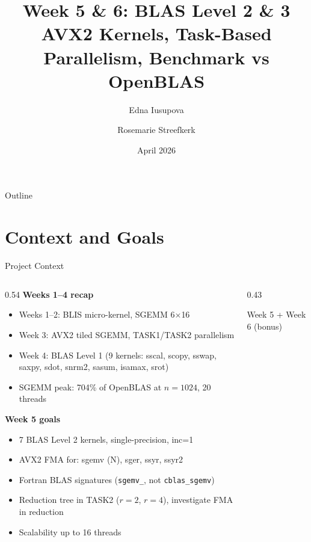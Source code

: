 \documentclass[aspectratio=169,10pt]{beamer}
\title[HPC TER - Week 5 \& 6]{Week 5 \& 6: BLAS Level 2 \& 3\\
       AVX2 Kernels, Task-Based Parallelism, Benchmark vs OpenBLAS}
\author{Edna Iusupova \and Rosemarie Streefkerk}
\institute{M1 QDCS --- Université Paris-Saclay\\TER High-Performance Computing}
\date{April 2026}
\begin{document}

\begin{frame}[plain]
  \titlepage
\end{frame}

\begin{frame}{Outline}
  \tableofcontents
\end{frame}

\section{Context and Goals}

\begin{frame}{Project Context}
  \begin{columns}
    \begin{column}{0.54\textwidth}
      \textbf{Weeks 1--4 recap}
      \begin{itemize}
        \item Weeks 1--2: BLIS micro-kernel, SGEMM 6$\times$16
        \item Week 3: AVX2 tiled SGEMM, TASK1/TASK2 parallelism
        \item Week 4: BLAS Level 1 (9 kernels: sscal, scopy, sswap, saxpy, sdot, snrm2, sasum, isamax, srot)
        \item SGEMM peak: \alert{704\% of OpenBLAS} at $n=1024$, 20 threads
      \end{itemize}
      \vspace{0.4em}
      \textbf{Week 5 goals}
      \begin{itemize}
        \item 7 BLAS Level 2 kernels, single-precision, inc=1
        \item AVX2 FMA for: sgemv (N), sger, ssyr, ssyr2
        \item Fortran BLAS signatures (\texttt{sgemv\_}, not \texttt{cblas\_sgemv})
        \item Reduction tree in TASK2 ($r=2$, $r=4$), investigate FMA in reduction
        \item Scalability up to 16 threads
      \end{itemize}
    \end{column}
    \begin{column}{0.43\textwidth}
      \begin{block}{Week 5 + Week 6 (bonus)}

\end{block}
\end{column}
\end{columns}
\end{frame}
\end{document}
